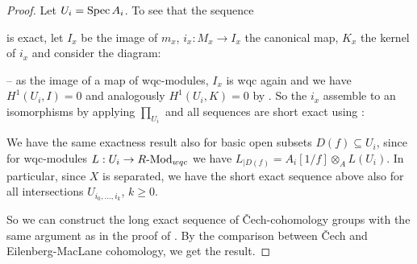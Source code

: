 \begin{proof}
  Let $U_i=\operatorname{Spec} A_i$.
  To see that the sequence
  \begin{center}
   \end{center}
   is exact, let $I_x$ be the image of $m_x$, $i_x:M_x\to I_x$ the canonical map, $K_x$ the kernel of $i_x$ and consider the diagram:
  \begin{center}
   \end{center}
   -- as the image of a map of wqc-modules, $I_x$ is wqc again and we have $H^1(U_i,I)=0$ and analogously $H^1(U_i,K)=0$ by .
   So the $i_x$ assemble to an isomorphisms by applying $\prod_{U_i}$ and all sequences are short exact using :
  \begin{center}
   \end{center}   

   We have the same exactness result also for basic open subsets $D(f)\subseteq U_i$,
   since for wqc-modules $L:U_i\to R\text{-}\mathrm{Mod}_{wqc}$ we have $L_{\vert D(f)}=A_i[1/f]\otimes_A L(U_i)$.
   In particular, since $X$ is separated, we have the short exact sequence above also for all intersections $U_{i_0,\dots,i_k}$, $k\geq 0$.
   
   So we can construct the long exact sequence of \v{C}ech-cohomology groups with the same argument as in the proof of .
   By the comparison  between \v{C}ech and Eilenberg-MacLane cohomology, we get the result.
\end{proof}

